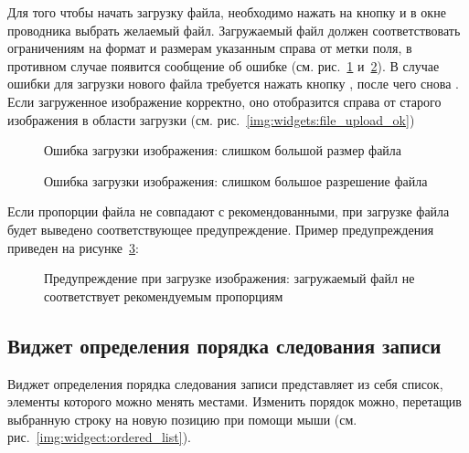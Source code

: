 Для того чтобы начать загрузку файла, необходимо нажать на кнопку  и в окне проводника выбрать желаемый файл. Загружаемый файл должен соответствовать ограничениям на формат и размерам указанным справа от метки поля, в противном случае появится сообщение об ошибке (см. рис.~\ref{img:widget:file_upload_size_error} и~\ref{img:widget:file_upload_dimension_errorr}). В случае ошибки для загрузки нового файла требуется нажать кнопку , после чего снова . Если загруженное изображение корректно, оно отобразится справа от старого изображения в области загрузки (см. рис.~\ref{img:widgets:file_upload_ok})

\begin{figure}[H]
	\caption{Ошибка загрузки изображения: слишком большой размер файла}
	\label{img:widget:file_upload_size_error}
\end{figure}

\begin{figure}[H]
	\caption{Ошибка загрузки изображения: слишком большое разрешение файла}
	\label{img:widget:file_upload_dimension_errorr}
\end{figure}	

Если пропорции файла не совпадают с рекомендованными, при загрузке файла будет выведено соответствующее предупреждение.
Пример предупреждения приведен на рисунке~\ref{img:widget:file_upload_warning}:
\begin{figure}[H]
	\caption{Предупреждение при загрузке изображения: загружаемый файл не соответствует рекомендуемым пропорциям}
	\label{img:widget:file_upload_warning}
\end{figure}

\subsection{Виджет определения порядка следования записи}
\label{widget:ordering}
Виджет определения порядка следования записи представляет из себя список, элементы которого можно менять местами. Изменить порядок можно, перетащив выбранную строку на новую позицию при помощи мыши (см. рис.~\ref{img:widgect:ordered_list}).

